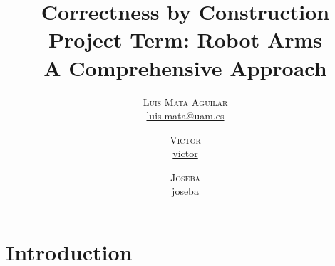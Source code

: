 \documentclass{article}
\title{
  Correctness by Construction\\
  \Large Project Term: Robot Arms\\
  \large A Comprehensive Approach
}
\author{
  \textsc{Luis Mata Aguilar}\\ \href{mailto:luis.mata@uam.es}{luis.mata@uam.es}
  \and
  \textsc{Victor }\\ \href{mailto:victor}{victor}
  \and
  \textsc{Joseba }\\ \href{mailto:joseba}{joseba}
}
\begin{document}
\maketitle

\tableofcontents
\newpage

\section{Introduction}
\label{sec:intro}
\cite{Hoang2013}

\newpage
{}

\end{document}
